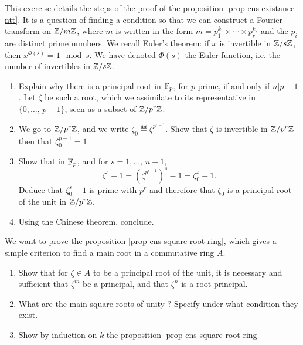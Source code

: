 
\begin{exo}
\label{exo-demo-cns-existance-ntt}
 
   This exercise details the steps of the proof of the proposition \ref{prop-cns-existance-ntt}. It is a question of finding a condition so that we can construct a Fourier transform on $ \mathbb{Z}/m \mathbb{Z} $, where $ m $ is written in the form $ m = p_1^{k_1} \times \cdots \times p_r^{k_r} $ and the $ p_i $ are distinct prime numbers. We recall Euler's theorem: if $ x $ is invertible in $ \mathbb{Z}/s \mathbb{Z} $, then $ x^{\Phi (s)} = 1 \mod{s} $. We have denoted $ \Phi (s) $ the Euler function, i.e. the number of invertibles in $ \mathbb{Z}/s \mathbb{Z} $. \begin{enumerate}
\item Explain why there is a  principal root in $ \mathbb{F}_p $, for $ p $ prime, if and only if $ n | p-1 $. Let $ \zeta $ be such a root, which we assimilate to its representative in $ \{0, \ldots, \, p-1\} $, seen as a subset of $ \mathbb{Z}/p^r \mathbb{Z} $.
\item We go to $ \mathbb{Z}/p^r \mathbb{Z} $, and we write $ \zeta_0 \eqdef \zeta^{p^{r-1}} $. Show that $ \zeta $ is invertible in $ \mathbb{Z}/p^r \mathbb{Z} $ then that $ \zeta_0^{p-1} = 1 $.
\item Show that in $ \mathbb{F}_p $, and for $ s = 1, \ldots, \, n-1 $,
\begin{equation*}
\zeta^s - 1 = \left(\zeta^{p^{r-1}} \right)^s - 1 = \zeta_0^s - 1.
\end{equation*}
Deduce that $ \zeta_0^s-1 $ is prime with $ p^r $ and therefore that $ \zeta_0 $ is a principal  root of the unit in $ \mathbb{Z}/p^r \mathbb{Z} $.
\item {} Using the Chinese theorem, conclude.
\end{enumerate}
\end{exo}
 
 
\begin{exo}
\label{exo-root-square-primitive}
 
We want to prove the proposition \ref{prop-cns-square-root-ring}, which gives a simple criterion to find a main  root in a commutative ring $ A $. 
\begin{enumerate}
\item Show that for $ \zeta \in A $ to be a  principal root of the unit, it is necessary and sufficient that $ \zeta^m $ be a  principal, and that $ \zeta^n $ is a root  principal.
\item What are the main square roots of unity ? Specify under what condition they exist. 
\item Show by induction on $ k $ the proposition \ref{prop-cns-square-root-ring}
\end{enumerate}
\end{exo}
 
